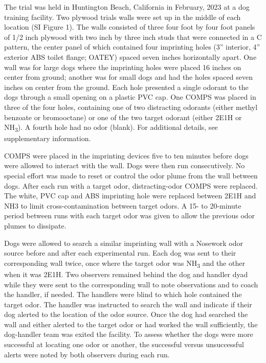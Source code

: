 \documentclass[
]{article}
\begin{document}
The trial was held in Huntington Beach, California in February, 2023 at a dog training facility. Two plywood trials walls were set up in the middle of each location (SI Figure 1). The walls consisted of three four foot by four foot panels of 1/2 inch plywood with two inch by three inch studs that were connected in a C pattern, the center panel of which contained four imprinting holes (3'' interior, 4'' exterior ABS toilet flange; OATEY) spaced seven inches horizontally apart. One wall was for large dogs where the imprinting holes were placed 16 inches on center from ground; another was for small dogs and had the holes spaced seven inches on center from the ground. Each hole presented a single odorant to the dogs through a small opening on a plastic PVC cap. One COMPS was placed in three of the four holes, containing one of two distracting odorants (either methyl benzoate or bromooctane) or one of the two target odorant (either 2E1H or NH\textsubscript{3}). A fourth hole had no odor (blank). For additional details, see supplementary information.

COMPS were placed in the imprinting devices five to ten minutes before dogs were allowed to interact with the wall. Dogs were then run consecutively. No special effort was made to reset or control the odor plume from the wall between dogs. After each run with a target odor, distracting-odor COMPS were replaced. The white, PVC cap and ABS imprinting hole were replaced between 2E1H and NH3 to limit cross-contamination between target odors. A 15- to 20-minute period between runs with each target odor was given to allow the previous odor plumes to dissipate.

Dogs were allowed to search a similar imprinting wall with a Nosework odor source before and after each experimental run. Each dog was sent to their corresponding wall twice, once where the target odor was NH\textsubscript{3} and the other when it was 2E1H. Two observers remained behind the dog and handler dyad while they were sent to the corresponding wall to note observations and to coach the handler, if needed. The handlers were blind to which hole contained the target odor. The handler was instructed to search the wall and indicate if their dog alerted to the location of the odor source. Once the dog had searched the wall and either alerted to the target odor or had worked the wall sufficiently, the dog-handler team was exited the facility. To assess whether the dogs were more successful at locating one odor or another, the successful versus unsuccessful alerts were noted by both observers during each run.
\end{document}
